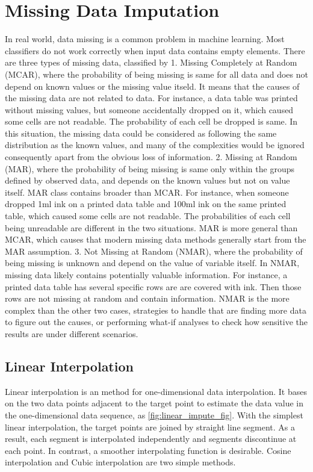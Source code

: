 \documentclass[12pt,a4paper,english
]{tunithesis}
\begin{document}
\section{Missing Data Imputation}
In real world, data missing is a common problem in machine learning. Most classifiers do not work correctly when input data contains empty elements.
There are three types of missing data, classified by \textcite{rubin1976}
1. Missing Completely at Random (MCAR), where the probability of being missing is same for all data and does not depend on known values or the missing value itseld. It means that the causes of the missing data are not related to data. For instance, a data table was printed without missing values, but someone accidentally dropped on it, which caused some cells are not readable. The probability of each cell be dropped is same. In this situation, the missing data could be considered as following the same distribution as the known values, and many of the complexities would be ignored consequently apart from the obvious loss of information.
2. Missing at Random (MAR), where the probability of being missing is same only within the groups defined by observed data, and depends on the known values but not on value itself. MAR class contains broader than MCAR. For instance, when someone dropped 1ml ink on a printed data table and 100ml ink on the same printed table, which caused some cells are not readable. The probabilities of each cell being unreadable are different in the two situations. MAR is more general than MCAR, which causes that modern missing data methods generally start from the MAR assumption.
3. Not Missing at Random (NMAR), where the probability of being missing is unknown and depend on the value of variable itself. In NMAR, missing data likely contains potentially valuable information. For instance, a printed data table has several specific rows are are covered with ink. Then those rows are not missing at random and contain information. NMAR is the more complex than the other two cases, strategies to handle that are finding more data to figure out the causes, or performing what-if analyses to check how sensitive the results are under different scenarios. \parencite{vanbuuren2018}
\subsection{Linear Interpolation}
Linear interpolation is an method for one-dimensional data interpolation. It bases on the two data points adjacent to the target point to estimate the data value in the one-dimensional data sequence, as \ref{fig:linear_impute_fig}. With the simplest linear interpolation, the target points are joined by straight line segment. As a result, each segment is interpolated independently and segments discontinue at each point. \parencite{huang2021, paul1999}
In contrast, a smoother interpolating function is desirable. Cosine interpolation and Cubic interpolation are two simple methods.
\end{document}
